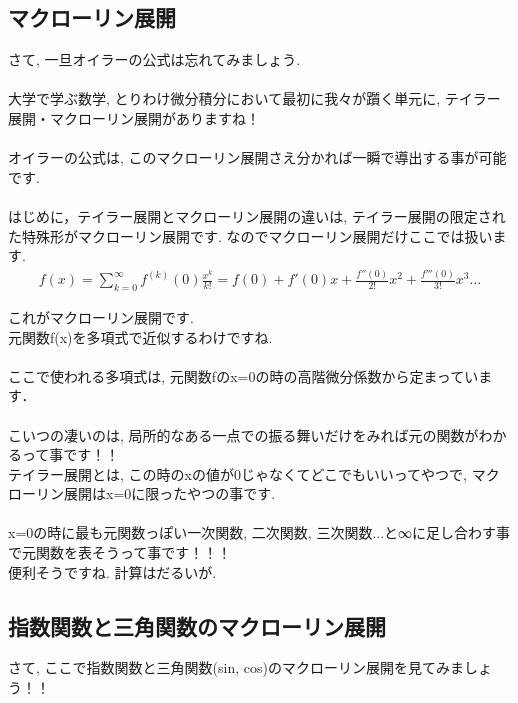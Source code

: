 \documentclass[11pt,a4paper,uplatex]{ujreport} 	%
\begin{document}
\subsection{マクローリン展開}
さて, 一旦オイラーの公式は忘れてみましょう.\\
\\
大学で学ぶ数学, とりわけ微分積分において最初に我々が躓く単元に, テイラー展開・マクローリン展開がありますね！\\
\\
オイラーの公式は, このマクローリン展開さえ分かれば一瞬で導出する事が可能です.\\
\\
はじめに，テイラー展開とマクローリン展開の違いは, テイラー展開の限定された特殊形がマクローリン展開です. なのでマクローリン展開だけここでは扱います.\\
\begin{eqnarray}
f(x) = \sum_{k=0}^\infty f^{(k)} (0) \frac{x^k}{k!} = f(0) + f'(0)x + \frac{f''(0)}{2!}x^2 + \frac{f'''(0)}{3!}x^3 ...
\end{eqnarray}

これがマクローリン展開です.\\
元関数f(x)を多項式で近似するわけですね.\\
\\
ここで使われる多項式は, 元関数fのx=0の時の高階微分係数から定まっています．\\
\\
こいつの凄いのは, 局所的なある一点での振る舞いだけをみれば元の関数がわかるって事です！！\\
テイラー展開とは, この時のxの値が0じゃなくてどこでもいいってやつで, マクローリン展開はx=0に限ったやつの事です.\\
\\
x=0の時に最も元関数っぽい一次関数, 二次関数, 三次関数...と∞に足し合わす事で元関数を表そうって事です！！！\\
便利そうですね. 計算はだるいが.\\
\subsection{指数関数と三角関数のマクローリン展開}
さて, ここで指数関数と三角関数(sin, cos)のマクローリン展開を見てみましょう！！\\
\end{document}
